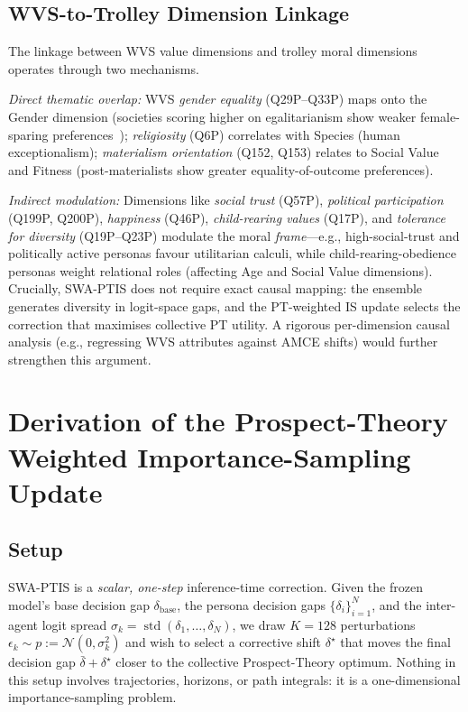\documentclass{article}
\begin{document}
\subsection{WVS-to-Trolley Dimension Linkage}
\label{app:wvs_linkage}

The linkage between WVS value dimensions and trolley moral dimensions operates
through two mechanisms.

\emph{Direct thematic overlap:} WVS \emph{gender equality} (Q29P--Q33P) maps onto
the Gender dimension (societies scoring higher on egalitarianism show weaker
female-sparing preferences~\citep{awad2018moral}); \emph{religiosity} (Q6P)
correlates with
Species (human exceptionalism); \emph{materialism orientation} (Q152, Q153)
relates to Social Value and Fitness (post-materialists show greater equality-of-outcome preferences).

\emph{Indirect modulation:} Dimensions like \emph{social trust} (Q57P),
\emph{political participation} (Q199P, Q200P), \emph{happiness} (Q46P),
\emph{child-rearing values} (Q17P), and \emph{tolerance for diversity}
(Q19P--Q23P) modulate the moral \emph{frame}---e.g., high-social-trust and
politically active personas favour utilitarian calculi, while
child-rearing-obedience personas weight relational roles (affecting Age and
Social Value dimensions). Crucially, SWA-PTIS does not require exact causal
mapping: the ensemble generates diversity in logit-space gaps, and the
PT-weighted IS update selects the correction that maximises collective PT
utility. A rigorous per-dimension causal analysis (e.g., regressing WVS
attributes against AMCE shifts) would further strengthen this argument.

\section{Derivation of the Prospect-Theory Weighted Importance-Sampling Update}
\label{app:is_theory}

\subsection{Setup}
SWA-PTIS is a \emph{scalar, one-step} inference-time correction. Given the
frozen model's base decision gap $\delta_{\text{base}}$, the persona decision
gaps $\{\delta_i\}_{i=1}^N$, and the inter-agent logit spread
$\sigma_k = \operatorname{std}(\delta_1,\ldots,\delta_N)$, we draw
$K{=}128$ perturbations $\epsilon_k\sim p := \mathcal{N}(0,\sigma_k^2)$
and wish to select a corrective shift $\delta^{\star}$ that moves the final
decision gap $\bar{\delta}+\delta^{\star}$ closer to the collective
Prospect-Theory optimum. Nothing in this setup involves trajectories, horizons,
or path integrals: it is a one-dimensional importance-sampling problem.
\end{document}
